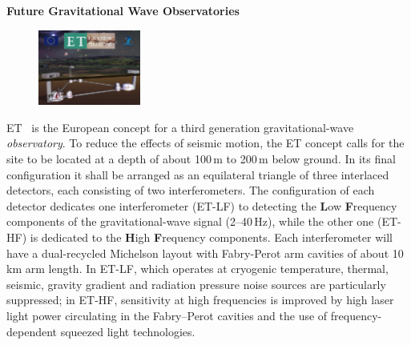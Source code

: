 \begin{DetBox}{\bf Future Gravitational Wave Observatories}
\label{Box:GWOs}
\begin{tcolorbox}[standard jigsaw,colback=amber!10!white,colframe=red!70!black,coltext=black,size=small,  title=The Einstein gravitational--wave Telescope (ET)] 
\begin{figure}
\vspace{-10pt}
\includegraphics*[width=0.3\textwidth]{Figures/ET_Thumb.png}
\label{fig:ET_Thumb}
\vspace{-25pt}
\end{figure}
ET~\cite{ET2011} is the European concept for a third generation gravitational-wave \emph{observatory}. To reduce the effects of seismic motion, the ET concept calls for the site to be located at a depth of about 100\,m to 200\,m below ground. In its final configuration it shall be arranged as an equilateral triangle of three interlaced detectors, each consisting of two interferometers. The configuration of each detector dedicates one interferometer (ET-LF) to detecting the \textbf{L}ow \textbf{F}requency components of the gravitational-wave signal (2--40\,Hz), while the other one (ET-HF) is dedicated to the \textbf{H}igh \textbf{F}requency components. Each interferometer will have a dual-recycled Michelson layout with Fabry-Perot arm cavities of about 10\,km arm length. In ET-LF, which operates at cryogenic temperature, thermal, seismic, gravity gradient and radiation pressure noise sources are particularly suppressed; in ET-HF, sensitivity at high frequencies is improved by high laser light power circulating in the Fabry--Perot cavities and the use of frequency-dependent squeezed light technologies.
\end{tcolorbox}



\end{DetBox}
